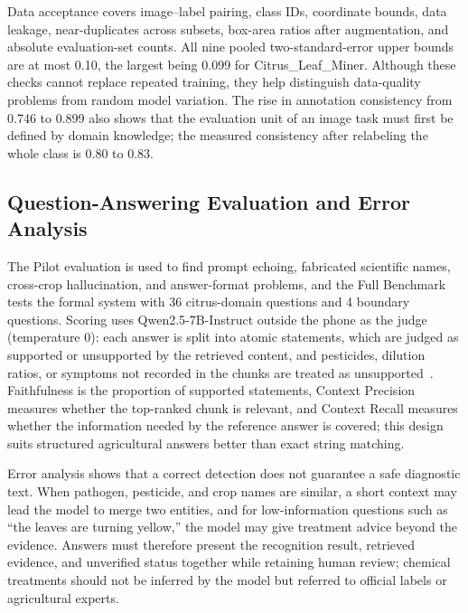 \documentclass[10pt,twocolumn,a4paper]{article}
\begin{document}
Data acceptance covers image–label pairing, class IDs, coordinate bounds, data leakage, near-duplicates across subsets, box-area ratios after augmentation, and absolute evaluation-set counts. All nine pooled two-standard-error upper bounds are at most 0.10, the largest being 0.099 for Citrus\_Leaf\_Miner. Although these checks cannot replace repeated training, they help distinguish data-quality problems from random model variation. The rise in annotation consistency from 0.746 to 0.899 also shows that the evaluation unit of an image task must first be defined by domain knowledge; the measured consistency after relabeling the whole class is 0.80 to 0.83.

\subsection{Question-Answering Evaluation and Error Analysis}
The Pilot evaluation is used to find prompt echoing, fabricated scientific names, cross-crop hallucination, and answer-format problems, and the Full Benchmark tests the formal system with 36 citrus-domain questions and 4 boundary questions. Scoring uses Qwen2.5-7B-Instruct outside the phone as the judge (temperature 0): each answer is split into atomic statements, which are judged as supported or unsupported by the retrieved content, and pesticides, dilution ratios, or symptoms not recorded in the chunks are treated as unsupported~\cite{es2023}. Faithfulness is the proportion of supported statements, Context Precision measures whether the top-ranked chunk is relevant, and Context Recall measures whether the information needed by the reference answer is covered; this design suits structured agricultural answers better than exact string matching.

Error analysis shows that a correct detection does not guarantee a safe diagnostic text. When pathogen, pesticide, and crop names are similar, a short context may lead the model to merge two entities, and for low-information questions such as “the leaves are turning yellow,” the model may give treatment advice beyond the evidence. Answers must therefore present the recognition result, retrieved evidence, and unverified status together while retaining human review; chemical treatments should not be inferred by the model but referred to official labels or agricultural experts.
\end{document}
